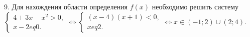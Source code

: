 9. Для нахождения области определения $f(x)$ необходимо решить систему $\begin{cases} 4+3x-x^2>0,\\ x-2
eq0.\end{cases}\Leftrightarrow
\begin{cases} (x-4)(x+1)<0,\\ x
eq2.\end{cases}\Leftrightarrow x\in(-1;2)\cup(2;4).$\\
